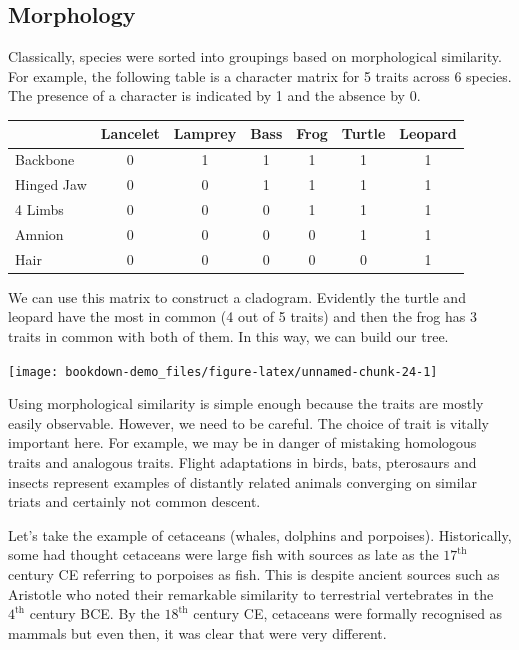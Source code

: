 \documentclass[
]{book}
\begin{document}
\hypertarget{morphology}{%
\subsection{Morphology}\label{morphology}}

Classically, species were sorted into groupings based on morphological similarity. For example, the following table is a character matrix for 5 traits across 6 species. The presence of a character is indicated by 1 and the absence by 0.

\begin{tabular}{l|c|c|c|c|c|c}
\hline
  & Lancelet & Lamprey & Bass & Frog & Turtle & Leopard\\
\hline
Backbone & 0 & 1 & 1 & 1 & 1 & 1\\
\hline
Hinged Jaw & 0 & 0 & 1 & 1 & 1 & 1\\
\hline
4 Limbs & 0 & 0 & 0 & 1 & 1 & 1\\
\hline
Amnion & 0 & 0 & 0 & 0 & 1 & 1\\
\hline
Hair & 0 & 0 & 0 & 0 & 0 & 1\\
\hline
\end{tabular}

We can use this matrix to construct a cladogram. Evidently the turtle and leopard have the most in common (4 out of 5 traits) and then the frog has 3 traits in common with both of them. In this way, we can build our tree.

\begin{center}\texttt{[image: bookdown-demo\_files/figure-latex/unnamed-chunk-24-1]} \end{center}

Using morphological similarity is simple enough because the traits are mostly easily observable. However, we need to be careful. The choice of trait is vitally important here. For example, we may be in danger of mistaking homologous traits and analogous traits. Flight adaptations in birds, bats, pterosaurs and insects represent examples of distantly related animals converging on similar triats and certainly not common descent.

Let's take the example of cetaceans (whales, dolphins and porpoises). Historically, some had thought cetaceans were large fish with sources as late as the \(\text{17}^{\text{th}}\) century CE referring to porpoises as fish. This is despite ancient sources such as Aristotle who noted their remarkable similarity to terrestrial vertebrates in the \(\text{4}^{\text{th}}\) century BCE. By the \(\text{18}^{\text{th}}\) century CE, cetaceans were formally recognised as mammals but even then, it was clear that were very different.
\end{document}
